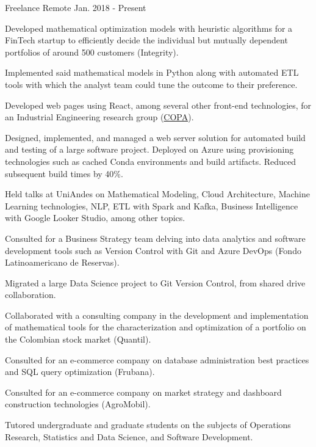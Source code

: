 

\begin{cventries}

	{Freelance} %
	{Remote} %
	{Jan. 2018 {-} Present} %
	{
		\begin{cvitems} %
			\item {Developed mathematical optimization models with heuristic algorithms for a FinTech startup to efficiently decide the individual but mutually dependent portfolios of around 500 customers (Integrity).}
			\item {Implemented said mathematical models in Python along with automated ETL tools with which the analyst team could tune the outcome to their preference.}
			\item {Developed  web pages using React, among several other front-end technologies, for an Industrial Engineering research group (\href{https://copa.uniandes.edu.co/en/}{COPA}).}
			\item {Designed, implemented, and managed a web server solution for automated build and testing of a large software project. Deployed on Azure using provisioning technologies such as cached Conda environments and build artifacts. Reduced subsequent build times by 40\%.}
			\item {Held talks at UniAndes on Mathematical Modeling, Cloud Architecture, Machine Learning technologies, NLP, ETL with Spark and Kafka, Business Intelligence with Google Looker Studio, among other topics.}
			\item {Consulted for a Business Strategy team delving into data analytics and software development tools such as Version Control with Git and Azure DevOps (Fondo Latinoamericano de Reservas).}
			\item {Migrated a large Data Science project to Git Version Control, from shared drive collaboration.}
			\item {Collaborated with a consulting company in the development and implementation of mathematical tools for the characterization and optimization of a portfolio on the Colombian stock market (Quantil).}
			\item {Consulted for an e-commerce company on database administration best practices and SQL query optimization (Frubana).}
			\item {Consulted for an e-commerce company on market strategy and dashboard construction technologies (AgroMobil).}
			\item {Tutored undergraduate and graduate students on the subjects of Operations Research, Statistics and Data Science, and Software Development.}
		\end{cvitems}
	}


\end{cventries}
